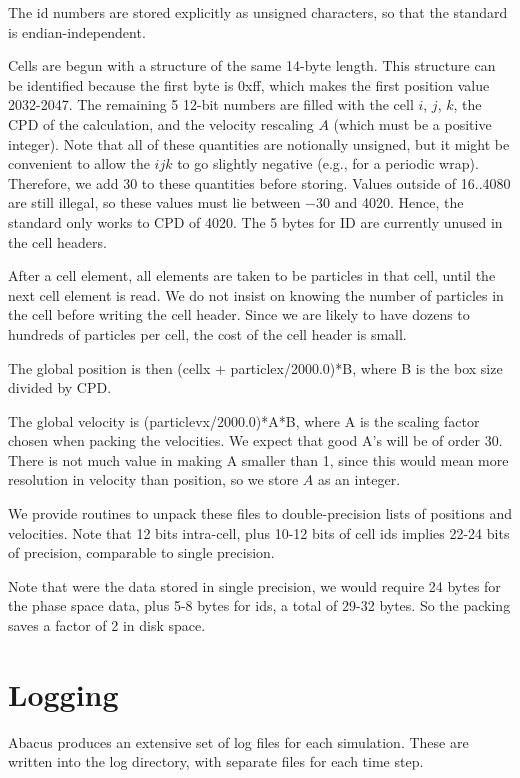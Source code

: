\documentclass[11pt,preprint]{aastex}
\begin{document}
The id numbers are stored explicitly as unsigned characters, so
that the standard is endian-independent.

Cells are begun with a structure of the same 14-byte length.  This
structure can be identified because the first byte is 0xff, which
makes the first position value 2032-2047.  The remaining 5
12-bit numbers are filled with the cell $i$, $j$, $k$, the CPD 
of the calculation, and the velocity rescaling $A$ (which must be
a positive integer).  Note that all of these quantities are notionally
unsigned, but it might be convenient to allow the  $ijk$ to go slightly
negative (e.g., for a periodic wrap).  Therefore, we add 30 to these
quantities before storing.  Values outside of 16..4080 are still illegal, 
so these values must lie between $-30$ and 4020.  Hence, the standard
only works to CPD of 4020.  The 5 bytes for ID are currently unused
in the cell headers.

After a cell element, all elements are taken to be particles in
that cell, until the next cell element is read.  We do not insist
on knowing the number of particles in the cell before writing the
cell header.  Since we are likely to have dozens to hundreds of
particles per cell, the cost of the cell header is small.

The global position is then (cellx + particlex/2000.0)*B, where B
is the box size divided by CPD.  

The global velocity is (particlevx/2000.0)*A*B, where A is the
scaling factor chosen when packing the velocities.  We expect
that good A's will be of order 30.  There is not much value in 
making A smaller than 1, since this would mean more resolution 
in velocity than position, so we store $A$ as an integer. 

We provide routines to unpack these files to double-precision lists of
positions and velocities.  Note that 12 bits intra-cell, plus 10-12 bits
of cell ids implies 22-24 bits of precision, comparable to single precision.

Note that were the data stored in single precision, we would require
24 bytes for the phase space data, plus 5-8 bytes for ids, a total of 
29-32 bytes.  So the packing saves a factor of 2 in disk space.

\section{Logging}

Abacus produces an extensive set of log files for each simulation.
These are written into the log directory, with separate files for
each time step. 
\end{document}
